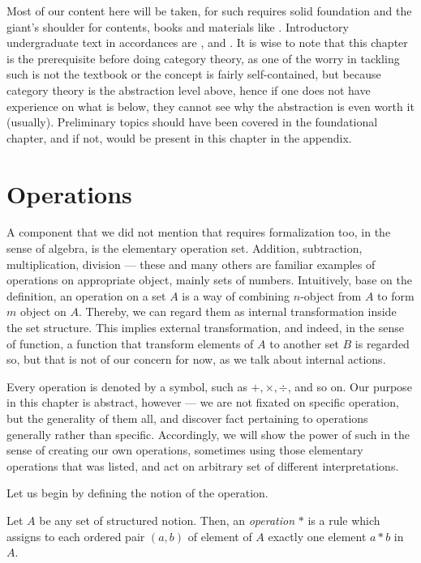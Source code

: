 Most of our content here will be taken, for such requires solid foundation and the giant's shoulder for contents, books and materials like \cite{Dummit_Foote_2004,Artin_2011,Herstein_1975,Hungerford_1974,Gallian_2013,vanderWaerden_1930,Judson_2023,MacLane_1978}. Introductory undergraduate text in accordances are \cite{Cameron_2008,Armstrong_2010,Beardon_2005,Whitehead_2003,Carter_2009,Smith_Tabachnikova_2000}, and \cite{MathLibreTexts_Algebra}. It is wise to note that this chapter is the prerequisite before doing category theory, as one of the worry in tackling such is not the textbook or the concept is fairly self-contained, but because category theory is the abstraction level above, hence if one does not have experience on what is below, they cannot see why the abstraction is even worth it (usually). Preliminary topics should have been covered in the foundational chapter, and if not, would be present in this chapter in the appendix. 

\section{Operations}

A component that we did not mention that requires formalization too, in the sense of algebra, is the elementary operation set. Addition, subtraction, multiplication, division --- these and many others are familiar examples of operations on appropriate object, mainly sets of numbers. Intuitively, base on the definition, an operation on a set $A$ is a way of combining $n$-object from $A$ to form $m$ object on $A$. Thereby, we can regard them as internal transformation inside the set structure. This implies external transformation, and indeed, in the sense of function, a function that transform elements of $A$ to another set $B$ is regarded so, but that is not of our concern for now, as we talk about internal actions. 

Every operation is denoted by a symbol, such as $+,\times,\div$, and so on. Our purpose in this chapter is abstract, however --- we are not fixated on specific operation, but the generality of them all, and discover fact pertaining to operations generally rather than specific. Accordingly, we will show the power of such in the sense of creating our own operations, sometimes using those elementary operations that was listed, and act on arbitrary set of different interpretations. 

Let us begin by defining the notion of the operation. 
\begin{definition}[Operation]
    Let $A$ be any set of structured notion. Then, an \textit{operation} $*$ is a rule which assigns to each ordered pair $(a,b)$ of element of $A$ exactly one element $a*b$ in $A$. 
\end{definition}


